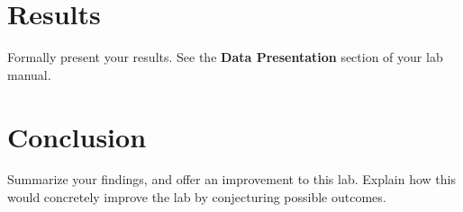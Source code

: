 \documentclass[12pt]{article}
\begin{document}
\section{Results}
Formally present your results. See the \textbf{Data Presentation} section of your lab manual.

\newpage

\section{Conclusion}
Summarize your findings, and offer an improvement to this lab. Explain how this would concretely improve the lab by conjecturing possible outcomes.

\newpage
\thispagestyle{plain}
\mbox{}
\newpage
\end{document}
